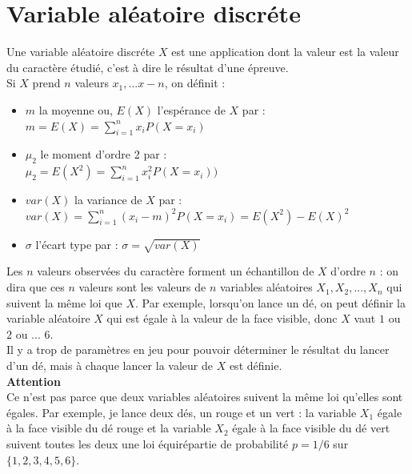 \documentclass[a4paper,11pt]{book}
\begin{document}
\section{Variable al\'eatoire discr\'ete}
Une variable al\'eatoire discr\'ete $X$ est une application dont la valeur est 
la valeur du caract\`ere \'etudi\'e,  c'est \`a dire le r\'esultat d'une 
\'epreuve.\\
Si $X$ prend $n$ valeurs $x_1,...x-n$, on d\'efinit :
\begin{itemize}
\item  $m$ la moyenne ou, $E(X)$ l'esp\'erance de $X$  par :\\
$m=E(X)=\sum_{i=1}^n x_iP(X=x_i)$
\item $\mu_2$ le moment d'ordre 2 par :\\
$\mu_2=E(X^2)=\sum_{i=1}^n x_i^2P(X=x_i))$ 
\item $var(X)$ la variance de $X$ par :\\
$var(X)=\sum_{i=1}^n (x_i-m)^2P(X=x_i)=E(X^2)-E(X)^2$
\item $\sigma$ l'\'ecart type par :
$\sigma=\sqrt{var(X)}$
\end{itemize}
Les $n$ valeurs observ\'ees du caract\`ere forment un \'echantillon de $X$ 
d'ordre $n$ : on dira que ces $n$ valeurs sont les valeurs de $n$ variables
al\'eatoires $X_1,X_2,...,X_n$ qui suivent la m\^eme loi que $X$.
Par exemple, lorsqu'on lance un d\'e, on peut d\'efinir la variable al\'eatoire
$X$ qui est \'egale \`a la valeur de la face visible, donc $X$ vaut $1$ ou $2$ 
ou ... $6$.\\
Il y a trop de param\`etres en jeu pour pouvoir d\'eterminer le r\'esultat 
du lancer d'un d\'e, mais \`a chaque lancer la valeur de $X$ est d\'efinie.\\
{\bf Attention}\\
 Ce n'est pas parce que deux variables al\'eatoires suivent la 
m\^eme loi qu'elles sont \'egales. Par exemple, je lance deux d\'es, un rouge 
et un vert : la variable $X_1$ \'egale \`a la face visible du d\'e rouge et la 
variable $X_2$ \'egale \`a la face visible du d\'e vert suivent toutes les deux
une loi \'equir\'epartie de probabilit\'e $p=1/6$ sur 
$\{1,2,3,4,5,6\}$. 
\end{document}
